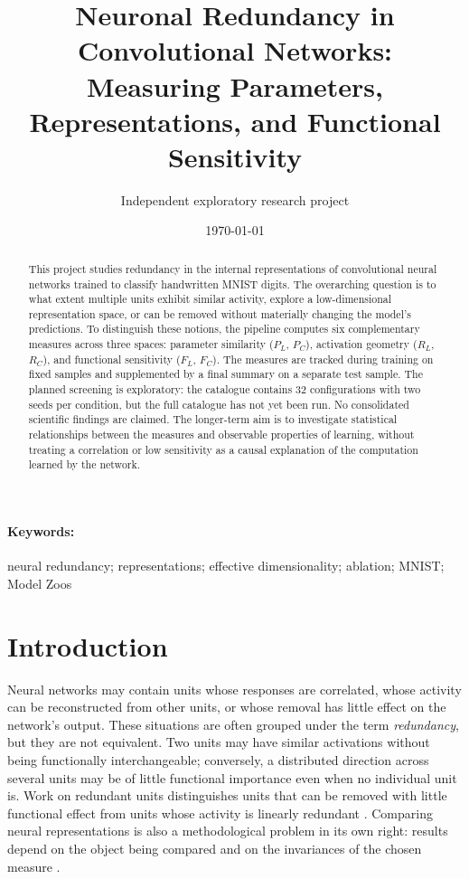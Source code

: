 \documentclass[11pt,a4paper]{article}
\title{Neuronal Redundancy in Convolutional Networks:\\
Measuring Parameters, Representations, and Functional Sensitivity}
\author{Independent exploratory research project}
\date{\today}
\begin{document}
\maketitle

\begin{abstract}
This project studies redundancy in the internal representations of convolutional neural networks trained to classify handwritten MNIST digits. The overarching question is to what extent multiple units exhibit similar activity, explore a low-dimensional representation space, or can be removed without materially changing the model's predictions. To distinguish these notions, the pipeline computes six complementary measures across three spaces: parameter similarity ($P_L$, $P_C$), activation geometry ($R_L$, $R_C$), and functional sensitivity ($F_L$, $F_C$). The measures are tracked during training on fixed samples and supplemented by a final summary on a separate test sample. The planned screening is exploratory: the catalogue contains 32 configurations with two seeds per condition, but the full catalogue has not yet been run. No consolidated scientific findings are claimed. The longer-term aim is to investigate statistical relationships between the measures and observable properties of learning, without treating a correlation or low sensitivity as a causal explanation of the computation learned by the network.
\end{abstract}

\paragraph{Keywords:}
neural redundancy; representations; effective dimensionality; ablation; MNIST; Model Zoos

\section{Introduction}

Neural networks may contain units whose responses are correlated, whose activity can be reconstructed from other units, or whose removal has little effect on the network's output. These situations are often grouped under the term \emph{redundancy}, but they are not equivalent. Two units may have similar activations without being functionally interchangeable; conversely, a distributed direction across several units may be of little functional importance even when no individual unit is. Work on redundant units distinguishes units that can be removed with little functional effect from units whose activity is linearly redundant \citep{casper2021frivolous}. Comparing neural representations is also a methodological problem in its own right: results depend on the object being compared and on the invariances of the chosen measure \citep{kornblith2019similarity}.
\end{document}
